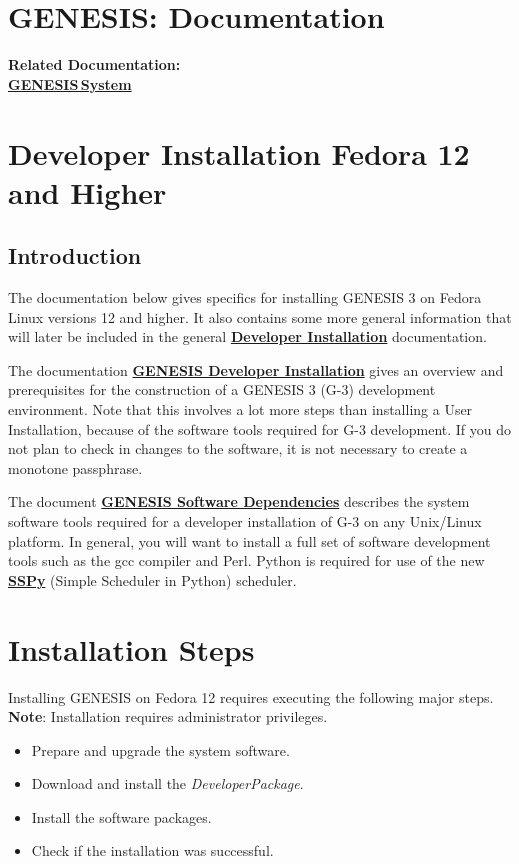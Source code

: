 \documentclass[12pt]{article}
\begin{document}
\section*{GENESIS: Documentation}

{\bf Related Documentation:} \\
\href{../genesis-system/genesis-system.tex}{\bf GENESIS\,System}

\section*{Developer Installation Fedora 12 and Higher}

\subsection*{Introduction}

The documentation below gives specifics for installing GENESIS 3 on Fedora
Linux versions 12 and higher. It also contains some more general
information that will later be included in the general 
\href {../developer-installation/developer-installation.html}{\bf
Developer Installation} documentation.

The documentation 
\href {../installation-developer/installation-developer.html}{\bf GENESIS
Developer Installation} gives an overview and prerequisites for the
construction of a GENESIS 3 (G-3) development environment. Note that this
involves a lot more steps than installing a User Installation, because of
the software tools required for G-3 development.  If you do not plan to
check in changes to the software, it is not necessary to create a monotone
passphrase.

The document 
\href {../genesis-dependencies/genesis-dependencies.html}{\bf GENESIS Software
Dependencies} describes the system software tools required for a developer
installation of G-3 on any Unix/Linux platform.  In general, you will want
to install a full set of software development tools such as the gcc
compiler and Perl.  Python is required for use of the new 
\href {../sspy/sspy.html}{\bf SSPy} (Simple Scheduler in Python) scheduler.

\section*{Installation Steps}

Installing GENESIS on Fedora 12 requires executing the following major steps. {\bf Note}: Installation requires administrator privileges.
\begin{itemize}
   \item[] Prepare and upgrade the system software.
   \item[] Download and install the {\it DeveloperPackage}.
   \item[] Install the software packages.
   \item[] Check if the installation was successful. 
\end{itemize}
\end{document}
